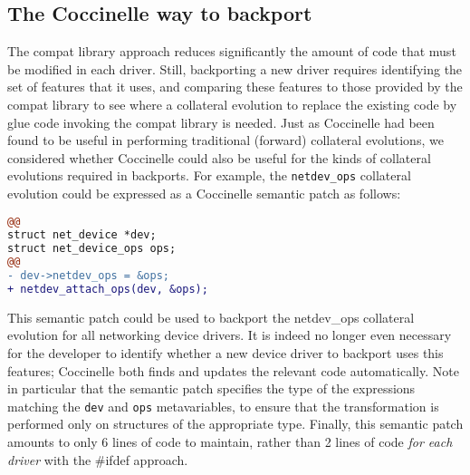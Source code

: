 \subsection{The Coccinelle way to backport}

The compat library approach reduces significantly the amount of code that
must be modified in each driver. Still, backporting a new driver requires
identifying the set of features that it uses, and comparing these features
to those provided by the compat library to see where a collateral evolution
to replace the existing code by glue code invoking the compat library is
needed.  Just as Coccinelle had been found to be useful in performing
traditional (forward) collateral evolutions, we considered whether
Coccinelle could also be useful for the kinds of collateral evolutions
required in backports. For example, the {\tt netdev\_\-ops} collateral
evolution could be expressed as a Coccinelle semantic patch as follows:

\begin{lstlisting}[language=diff]
@@
struct net_device *dev;
struct net_device_ops ops;
@@
- dev->netdev_ops = &ops;
+ netdev_attach_ops(dev, &ops);
\end{lstlisting}

This semantic patch could be used to backport the netdev\_\-ops collateral
evolution for all networking device drivers.  It is indeed no longer even
necessary for the developer to identify whether a new device driver to
backport uses this features; Coccinelle both finds and updates the relevant
code automatically.  Note in particular that the semantic patch specifies
the type of the expressions matching the {\tt dev} and {\tt ops}
metavariables, to ensure that the transformation is performed only on
structures of the appropriate type.  Finally, this semantic patch amounts to
only 6 lines of code to maintain, rather than 2 lines of code {\em for each
  driver} with the \#ifdef approach.
